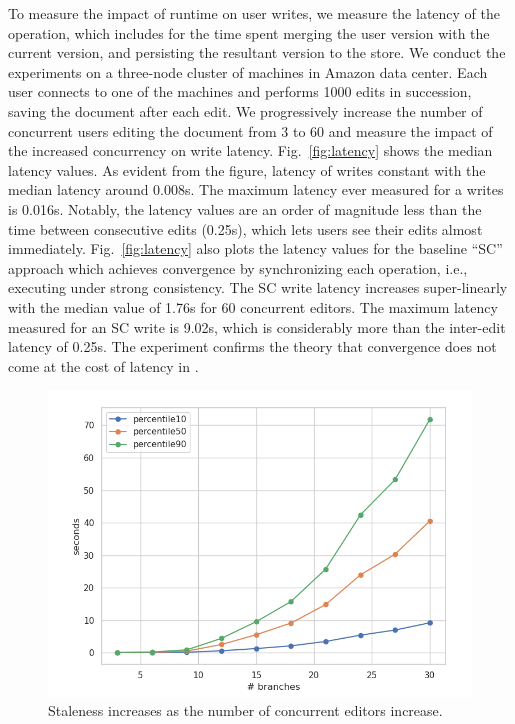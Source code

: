 To measure the impact of \quark runtime on user writes, we measure the
latency of the  operation, which includes for the time spent
merging the user version with the current version, and persisting the
resultant version to the store. We conduct the experiments on a
three-node cluster of  machines in Amazon 
data center. Each user connects to one of the machines and performs
1000 edits in succession, saving the document after each edit. We
progressively increase the number of concurrent users editing the
document from 3 to 60 and measure the impact of the increased
concurrency on write latency. Fig.~\ref{fig:latency} shows the median
latency values. As evident from the figure, latency of \quark writes
constant with the median latency around 0.008s. The maximum latency
ever measured for a \quark writes is 0.016s. Notably, the latency
values are an order of magnitude less than the time between
consecutive edits (0.25s), which lets users see their edits almost
immediately. Fig.~\ref{fig:latency} also plots the latency values for
the baseline ``SC'' approach which achieves convergence by
synchronizing each operation, i.e., executing under strong
consistency. The SC write latency increases super-linearly with the
median value of 1.76s for 60 concurrent editors. The maximum latency
measured for an SC write is 9.02s, which is considerably more than the
inter-edit latency of 0.25s. The experiment confirms the theory that
convergence does not come at the cost of latency in \quark.

\begin{figure}[ht]
  \centering
    \includegraphics[scale=0.3]{Figures/staleness}
\caption{Staleness increases as the number of concurrent editors
  increase.}
\label{fig:staleness}
  \vspace*{-0.2in}
\end{figure}

